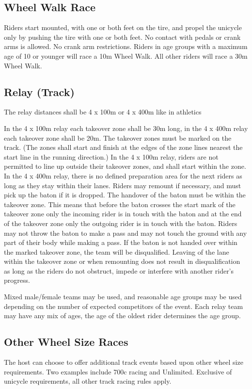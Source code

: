 \subsection{Wheel Walk Race}

Riders start mounted, with one or both feet on the tire, and propel the unicycle only by pushing the tire with one or both feet.
No contact with pedals or crank arms is allowed.
No crank arm restrictions.
Riders in age groups with a maximum age of 10 or younger will race a 10m Wheel Walk.
All other riders will race a 30m Wheel Walk.

\subsection{Relay (Track)}
The relay distances shall be 4 x 100m or 4 x 400m like in athletics

In the 4 x 100m relay each takeover zone shall be 30m long, in the 4 x 400m relay each takeover zone shall be 20m.
The takeover zones must be marked on the track.
(The zones shall start and finish at the edges of the zone lines nearest the start line in the running direction.)
In the 4 x 100m relay, riders are not permitted to line up outside their takeover zones, and shall start within the zone.
In the 4 x 400m relay, there is no defined preparation area for the next riders as long as they stay within their lanes.
Riders may remount if necessary, and must pick up the baton if it is dropped.
The handover of the baton must be within the takeover zone.
This means that before the baton crosses the start mark of the takeover zone only the incoming rider is in touch with the baton and at the end of the takeover zone only the outgoing rider is in touch with the baton.
Riders may not throw the baton to make a pass and may not touch the ground with any part of their body while making a pass.
If the baton is not handed over within the marked takeover zone, the team will be disqualified.
Leaving of the lane within the takeover zone or when remounting does not result in disqualification as long as the riders do not obstruct, impede or interfere with another rider’s progress.

Mixed male/female teams may be used, and reasonable age groups may be used depending on the number of expected competitors of the event.
Each relay team may have any mix of ages, the age of the oldest rider determines the age group.

\subsection{Other Wheel Size Races}
The host can choose to offer additional track events based upon other wheel size requirements.
Two examples include 700c racing and Unlimited.
Exclusive of unicycle requirements, all other track racing rules apply.

